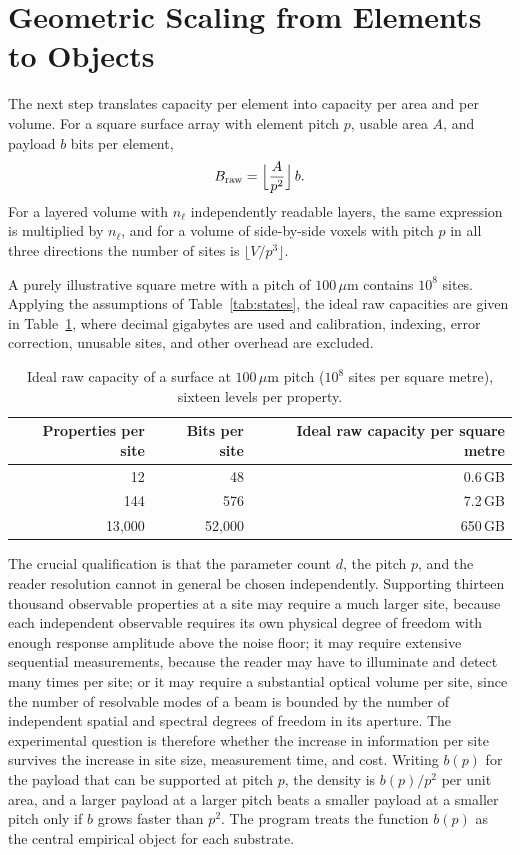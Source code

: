 \section{Geometric Scaling from Elements to Objects}\label{sec:geometry}

The next step translates capacity per element into capacity per area and per volume. For a square surface array with element pitch $p$, usable area $A$, and payload $b$ bits per element,
\begin{equation}\label{eq:braw}
B_{\mathrm{raw}}=\Bigl\lfloor\frac{A}{p^{2}}\Bigr\rfloor\,b .
\end{equation}
For a layered volume with $n_\ell$ independently readable layers, the same expression is multiplied by $n_\ell$, and for a volume of side-by-side voxels with pitch $p$ in all three directions the number of sites is $\lfloor V/p^{3}\rfloor$.

A purely illustrative square metre with a pitch of $100\,\mu\mathrm{m}$ contains $10^{8}$ sites. Applying the assumptions of Table~\ref{tab:states}, the ideal raw capacities are given in Table~\ref{tab:area}, where decimal gigabytes are used and calibration, indexing, error correction, unusable sites, and other overhead are excluded.

\begin{table}[h]
\centering
\small
\begin{tabular}{@{}rrr@{}}
\toprule
Properties per site & Bits per site & Ideal raw capacity per square metre \\
\midrule
12 & 48 & 0.6\,GB \\
144 & 576 & 7.2\,GB \\
13{,}000 & 52{,}000 & 650\,GB \\
\bottomrule
\end{tabular}
\caption{Ideal raw capacity of a surface at $100\,\mu\mathrm{m}$ pitch ($10^{8}$ sites per square metre), sixteen levels per property.}
\label{tab:area}
\end{table}

The crucial qualification is that the parameter count $d$, the pitch $p$, and the reader resolution cannot in general be chosen independently. Supporting thirteen thousand observable properties at a site may require a much larger site, because each independent observable requires its own physical degree of freedom with enough response amplitude above the noise floor; it may require extensive sequential measurements, because the reader may have to illuminate and detect many times per site; or it may require a substantial optical volume per site, since the number of resolvable modes of a beam is bounded by the number of independent spatial and spectral degrees of freedom in its aperture. The experimental question is therefore whether the increase in information per site survives the increase in site size, measurement time, and cost. Writing $b(p)$ for the payload that can be supported at pitch $p$, the density is $b(p)/p^{2}$ per unit area, and a larger payload at a larger pitch beats a smaller payload at a smaller pitch only if $b$ grows faster than $p^{2}$. The program treats the function $b(p)$ as the central empirical object for each substrate.

